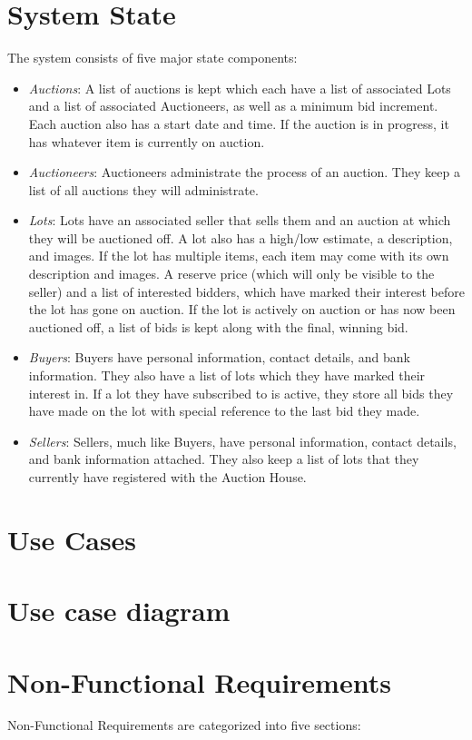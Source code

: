 \documentclass[titlepage, 12pt]{extarticle}
\begin{document}
\section{System State}
The system consists of five major state components:
\begin{itemize}
\item {\it Auctions}: A list of auctions is kept which each have a list of associated Lots and a list of associated Auctioneers, as well as a minimum bid increment. Each auction also has a start date and time. If the auction is in progress, it has whatever item is currently on auction.
\item {\it Auctioneers}: Auctioneers administrate the process of an auction. They keep a list of all auctions they will administrate.
\item {\it Lots}: Lots have an associated seller that sells them and an auction at which they will be auctioned off. A lot also has a high/low estimate, a description, and images. If the lot has multiple items, each item may come with its own description and images. A reserve price (which will only be visible to the seller) and a list of interested bidders, which have marked their interest before the lot has gone on auction. If the lot is actively on auction or has now been auctioned off, a list of bids is kept along with the final, winning bid.
\item {\it Buyers}: Buyers have personal information, contact details, and bank information. They also have a list of lots which they have marked their interest in. If a lot they have subscribed to is active, they store all bids they have made on the lot with special reference to the last bid they made.
\item {\it Sellers}: Sellers, much like Buyers, have personal information, contact details, and bank information attached. They also keep a list of lots that they currently have registered with the Auction House.
\end{itemize}

\section{Use Cases}

\section{Use case diagram}

\section{Non-Functional Requirements}
Non-Functional Requirements are categorized into five sections:
\end{document}
